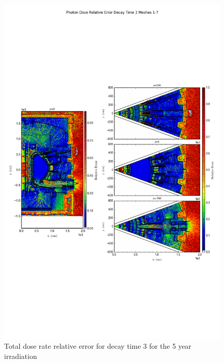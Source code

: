 \documentclass[12pt]{article}
\begin{document}
\begin{figure}[ht!]
\centering
\includegraphics[trim={0cm 8cm, 0cm 8cm},clip,scale=0.75]{../plots/final_model_with_b4c/5year/Photon_Dose_Relative_Error_Decay_Time_3_Meshes_1-7.png}
\caption{Total dose rate relative error for decay time 3 for the 5 year irradiation}
\label{fig:photons_5y_dc3_b4c_relerr}
\end{figure}
\clearpage
\newpage
\end{document}
